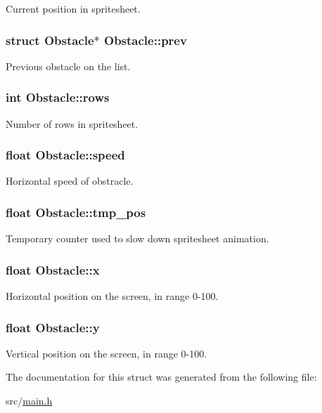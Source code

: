 Current position in spritesheet. \hypertarget{structObstacle_a13bc07b730f58d5b1c3db68e8e4aca27}{
\subsubsection[{prev}]{\setlength{\rightskip}{0pt plus 5cm}struct {\bf Obstacle}$\ast$ Obstacle\-::prev}}\label{structObstacle_a13bc07b730f58d5b1c3db68e8e4aca27}
Previous obstacle on the list. \hypertarget{structObstacle_aab33c9d4c0f05d02fda4e77cff7d7e72}{
\subsubsection[{rows}]{\setlength{\rightskip}{0pt plus 5cm}int Obstacle\-::rows}}\label{structObstacle_aab33c9d4c0f05d02fda4e77cff7d7e72}
Number of rows in spritesheet. \hypertarget{structObstacle_a1e2b46db05325273ce0fcba3550b5b2a}{
\subsubsection[{speed}]{\setlength{\rightskip}{0pt plus 5cm}float Obstacle\-::speed}}\label{structObstacle_a1e2b46db05325273ce0fcba3550b5b2a}
Horizontal speed of obstracle. \hypertarget{structObstacle_afd620c4c3496cd6f84184dcda4ca7611}{
\subsubsection[{tmp\-\_\-pos}]{\setlength{\rightskip}{0pt plus 5cm}float Obstacle\-::tmp\-\_\-pos}}\label{structObstacle_afd620c4c3496cd6f84184dcda4ca7611}
Temporary counter used to slow down spritesheet animation. \hypertarget{structObstacle_ad9cd25e0032f6692a4f93a057ccdfd85}{
\subsubsection[{x}]{\setlength{\rightskip}{0pt plus 5cm}float Obstacle\-::x}}\label{structObstacle_ad9cd25e0032f6692a4f93a057ccdfd85}
Horizontal position on the screen, in range 0-\/100. \hypertarget{structObstacle_af4b6f012014e2fa5aef193330f70fdef}{
\subsubsection[{y}]{\setlength{\rightskip}{0pt plus 5cm}float Obstacle\-::y}}\label{structObstacle_af4b6f012014e2fa5aef193330f70fdef}
Vertical position on the screen, in range 0-\/100. 

The documentation for this struct was generated from the following file\-:\begin{DoxyCompactItemize}
\item 
src/\hyperlink{main_8h}{main.\-h}\end{DoxyCompactItemize}
